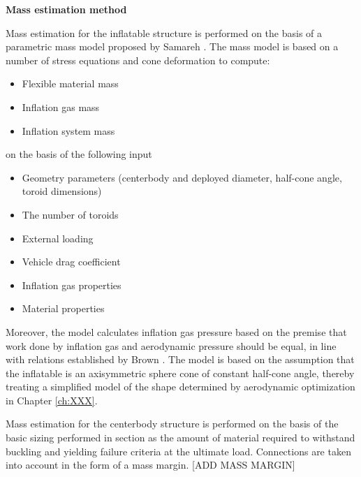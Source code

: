 \textbf{Mass estimation method}

Mass estimation for the inflatable structure is performed on the basis of a parametric mass model proposed by Samareh \cite{Samareh2011}. The mass model is based on a number of stress equations and cone deformation to compute:
\begin{itemize}
\item Flexible material mass
\item Inflation gas mass
\item Inflation system mass
\end{itemize}
on the basis of the following input
\begin{itemize}
\item Geometry parameters (centerbody and deployed diameter, half-cone angle, toroid dimensions)
\item The number of toroids
\item External loading
\item Vehicle drag coefficient
\item Inflation gas properties
\item Material properties
\end{itemize}
Moreover, the model calculates inflation gas pressure based on the premise that work done by inflation gas and aerodynamic pressure should be equal, in line with relations established by Brown \cite{Brown2009}. The model is based on the assumption that the inflatable is an axisymmetric sphere cone of constant half-cone angle, thereby treating a simplified model of the shape determined by aerodynamic optimization in Chapter \ref{ch:XXX}. 

Mass estimation for the centerbody structure is performed on the basis of the basic sizing performed in section \label{sec:struc_Centerbody} as the amount of material required to withstand buckling and yielding failure criteria at the ultimate load. Connections are taken into account in the form of a mass margin. [ADD MASS MARGIN] 








